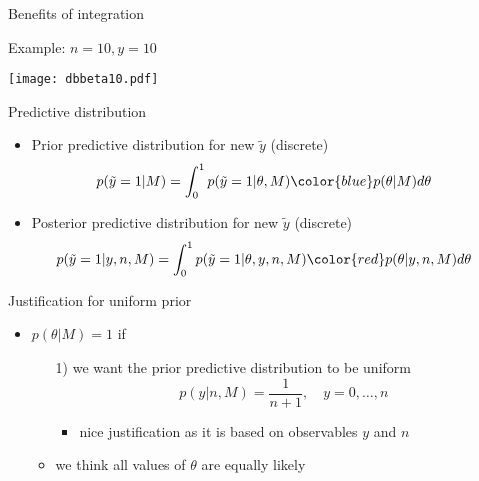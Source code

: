 \documentclass[english,t]{beamer}
\begin{document}
\begin{frame}{Benefits of integration}

  Example: $n=10, y=10$
  \begin{center}
  \texttt{[image: dbbeta10.pdf]}
  \end{center}

\end{frame}

\begin{frame}{Predictive distribution}

  \begin{itemize}
  \item {\color{blue} Prior predictive} distribution for new $\tilde{y}$ (discrete)
    \begin{align*}
      p(\tilde{y}=1|M) &= \int_0^1 p(\tilde{y}=1|\theta,M){\color{blue}p(\theta|M)}d\theta
    \end{align*}
  \item {\color{red} Posterior predictive} distribution for new $\tilde{y}$ (discrete)
    \begin{align*}
      p(\tilde{y}=1|y,n,M) &= \int_0^1 p(\tilde{y}=1|\theta,y,n,M){\color{red}p(\theta|y,n,M)}d\theta
    \end{align*}
  \end{itemize}
\end{frame}

\begin{frame}{Justification for uniform prior}

  \begin{itemize}
  \item $p(\theta|M)=1$ if
    \begin{itemize}
    \item[1)] we want the prior predictive distribution to be uniform
      \begin{equation*}
        p(y|n,M) = \frac{1}{n+1}, \quad y=0,\ldots,n
      \end{equation*}
      \begin{itemize}
      \item nice justification as it is based on observables $y$ and $n$
      \end{itemize}
     \item<2->[2)] we think all values of $\theta$ are equally likely
    \end{itemize} 
  \end{itemize}

\end{frame}
\end{document}
